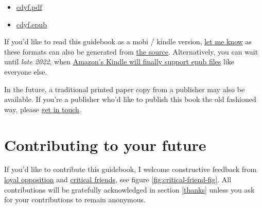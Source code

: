 \documentclass[
]{book}
\providecommand{\tightlist}{%
  \setlength{\itemsep}{0pt}\setlength{\parskip}{0pt}}
\begin{document}
\begin{itemize}
\tightlist
\item
  \href{https://www.cdyf.me/cdyf.pdf}{cdyf.pdf}
\item
  \href{https://www.cdyf.me/cdyf.epub}{cdyf.epub}
\end{itemize}

If you'd like to read this guidebook as a mobi / kindle version, \href{https://personalpages.manchester.ac.uk/staff/duncan.hull/contact.html}{let me know} as these formats can also be generated from \href{https://github.com/dullhunk/cdyf}{the source}. Alternatively, you can wait until \emph{late 2022}, when \href{https://mashable.com/article/amazon-kindle-epub}{Amazon's Kindle will finally support epub files} like everyone else.

In the future, a traditional printed paper copy from a publisher may also be available. If you're a publisher who'd like to publish this book the old fashioned way, please \href{https://personalpages.manchester.ac.uk/staff/duncan.hull/contact.html}{get in touch}.

\hypertarget{contributing}{%
\section{Contributing to your future}\label{contributing}}

If you'd like to contribute this guidebook, I welcome constructive feedback from \href{https://en.wikipedia.org/wiki/Loyal_opposition}{loyal opposition} and \href{https://en.wikipedia.org/wiki/Critical_friend}{critical friends}, see figure \ref{fig:critical-friend-fig}. All contributions will be gratefully acknowledged in section \ref{thanks} unless you ask for your contributions to remain anonymous.
\end{document}
